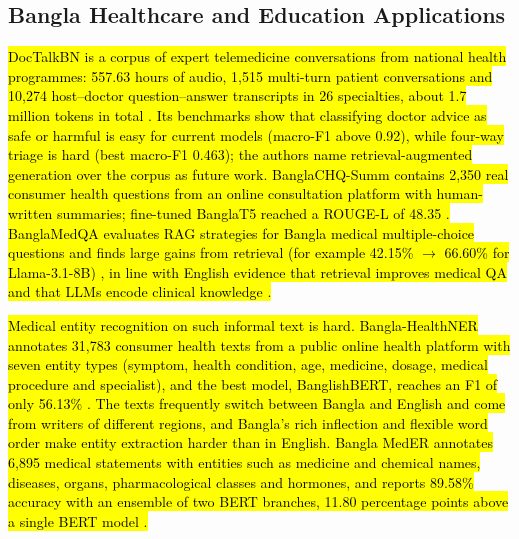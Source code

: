 \subsection{Bangla Healthcare and Education Applications}\label{bangla-healthcare-and-education-applications}

\hl{DocTalkBN is a corpus of expert telemedicine conversations from
national health programmes: 557.63 hours of audio, 1,515 multi-turn
patient conversations and 10,274 host--doctor question--answer
transcripts in 26 specialties, about 1.7 million tokens in total
\cite{saha2026doctalkbn}. Its benchmarks show that classifying doctor advice as safe or
harmful is easy for current models (macro-F1 above 0.92), while four-way
triage is hard (best macro-F1 0.463); the authors name
retrieval-augmented generation over the corpus as future work.
BanglaCHQ-Summ contains 2,350 real consumer health questions from an
online consultation platform with human-written summaries; fine-tuned
BanglaT5 reached a ROUGE-L of 48.35 \cite{khan2023banglachqsumm}. BanglaMedQA evaluates RAG
strategies for Bangla medical multiple-choice questions and finds large
gains from retrieval (for example 42.15\% \ensuremath{\rightarrow} 66.60\% for Llama-3.1-8B)
\cite{banglamedqa}, in line with English evidence that retrieval improves medical
QA \cite{xiong2024medrag} and that LLMs encode clinical knowledge \cite{singhal2023medpalm}.}

\hl{Medical entity recognition on such informal text is hard.
Bangla-HealthNER annotates 31,783 consumer health texts from a public
online health platform with seven entity types (symptom, health
condition, age, medicine, dosage, medical procedure and specialist), and
the best model, BanglishBERT, reaches an F1 of only 56.13\% \cite{khan2023nervous}.
The texts frequently switch between Bangla and English and come from
writers of different regions, and Bangla's rich inflection and flexible
word order make entity extraction harder than in English. Bangla MedER
annotates 6,895 medical statements with entities such as medicine and
chemical names, diseases, organs, pharmacological classes and hormones,
and reports 89.58\% accuracy with an ensemble of two BERT branches,
11.80 percentage points above a single BERT model \cite{aurpa2026banglameder}.}

